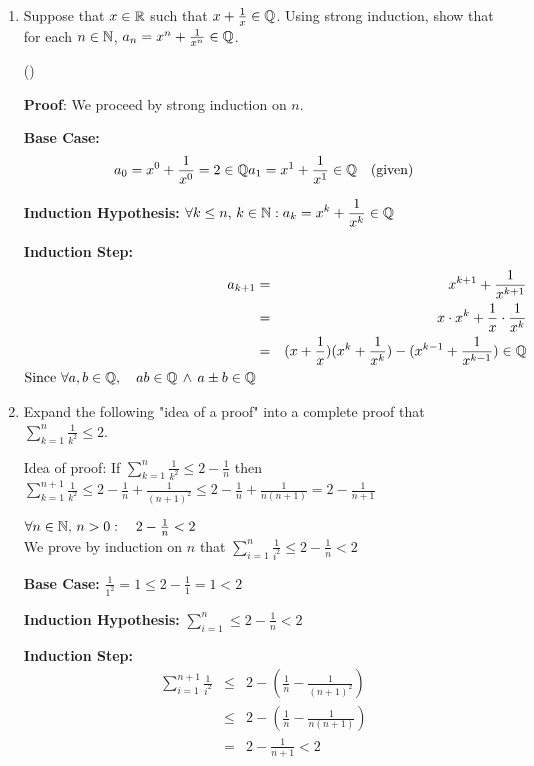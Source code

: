 \documentclass[11pt,fleqn]{article}
\begin{document}
\begin{enumerate}
\item Suppose that $x \in \mathbb{R}$ such that $x + \frac 1x \in \mathbb{Q}$.
Using strong induction, show that for each $n \in \mathbb{N}$, $a_n = x^n + \frac 1{x^n} \in \mathbb{Q}$.

()

\textbf{Proof}: We proceed by strong induction on $n$. 

{\bf Base Case:} \begin{equation*}
    a_0 = x^0 + \frac 1{x^0} = 2 \in \mathbb{Q} \\
    a_1 = x^1 + \frac 1{x^1} \in \mathbb{Q} \quad \text{(given)}
    \end{equation*}

{\bf Induction Hypothesis:} $\displaystyle \forall k \leq n,\, k \in \mathbb{N}: a_k = x^k + \frac 1{x^k} \in \mathbb{Q}$

{\bf Induction Step:} \begin{eqnarray*}
    a_{k+1} & = & x^{k+1} + \frac 1{x^{k+1}} \\
    & = & x \cdot x^k + \frac 1x \cdot \frac 1{x^k} \\
    & = & (x + \frac 1x)(x^k + \frac 1{x^k}) - (x^{k-1} + \frac 1{x^{k-1}}) \in \mathbb{Q} \\
    \text{Since } \forall a,b \in \mathbb{Q}, \quad ab \in \mathbb{Q} \, \land \, a \pm b \in \mathbb{Q}
    \end{eqnarray*}

\newpage
\item Expand the following "idea of a proof" into a complete proof that $\sum_{k = 1}^{n} \frac 1{k^2} \leq 2$.

Idea of proof: If $\sum_{k = 1}^{n} \frac 1{k^2} \leq 2 - \frac 1 n$ then 
$\sum_{k = 1}^{n+1} \frac 1{k^2} \leq 2 - \frac 1 n + \frac 1 {(n+1)^2} \leq 2 - \frac 1 n + \frac 1 {n(n+1)} = 2 - \frac 1 {n+1}$

$\forall n \in \mathbb{N},\, n > 0: \quad 2 - \frac 1n < 2$ \\
We prove by induction on $n$ that $\sum_{i=1}^{n} \frac 1{i^2} \leq 2 - \frac 1n < 2$

{\bf Base Case:} $\frac 1{1^2} = 1 \leq 2 - \frac 1{1} = 1 < 2$

{\bf Induction Hypothesis:} $\displaystyle\sum\limits_{i=1}^{n} \leq 2 - \frac 1n < 2$

{\bf Induction Step:} \begin{eqnarray*}
    \sum_{i=1}^{n+1} \frac 1{i^2} & \leq & 2 - \left(\frac 1n - \frac 1{(n+1)^2}\right) \\
    & \leq & 2 - \left(\frac 1n - \frac 1{n(n+1)}\right) \\
    & = & 2 - \frac 1{n+1} < 2 \\
    \end{eqnarray*}


\end{enumerate}
\end{document}

